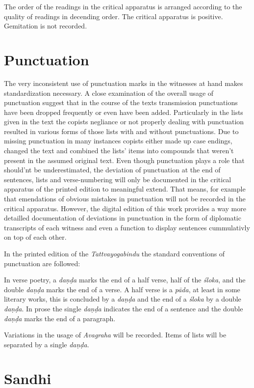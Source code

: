 The order of the readings in the critical apparatus is arranged according to the quality of readings in decending order. The critical apparatus is positive. Gemitation is not recorded. 

\section{Punctuation}

The very inconsistent use of punctuation marks in the witnesses at hand makes standardization necessary. A close examination of the overall usage of punctuation suggest that in the course of the texts transmission punctuations have been dropped frequently or even have been added. Particularly in the lists given in the text the copists negliance or not properly dealing with punctuation resulted in various forms of those lists with and without punctuations. Due to missing punctuation in many instances copists either made up case endings, changed the text and combined the lists' items into compounds that weren't present in the assumed original text. Even though punctuation plays a role that should'nt be underestimated, the deviation of punctuation at the end of sentences, lists and verse-numbering will only be documented in the critical apparatus of the printed edition to meaningful extend. That means, for example that emendations of obvious mistakes in punctuation will not be recorded in the critical apparatus. However, the digital edition of this work provides a way more detailled documentation of deviations in punctuation in the form of diplomatic transcripts of each witness and even a function to display sentences cummulativly on top of each other.

In the printed edition of the \textit{Tattvayogabindu} the standard conventions of punctuation are followed:

In verse poetry, a \textit{daṇḍa} marks the end of a half verse, half of the \textit{śloka}, and the double \textit{daṇḍa} marks the end of a verse. A half verse is a \textit{pāda}, at least in some literary works, this is concluded by a \textit{daṇḍa} and the end of a \textit{śloka} by a double \textit{daṇḍa}. In prose the single \textit{daṇḍa} indicates the end of a sentence and the double \textit{daṇḍa} marks the end of a paragraph.

Variations in the usage of \textit{Avagraha} will be recorded. Items of lists will be separated by a single \textit{daṇḍa}. 

\section{Sandhi}

